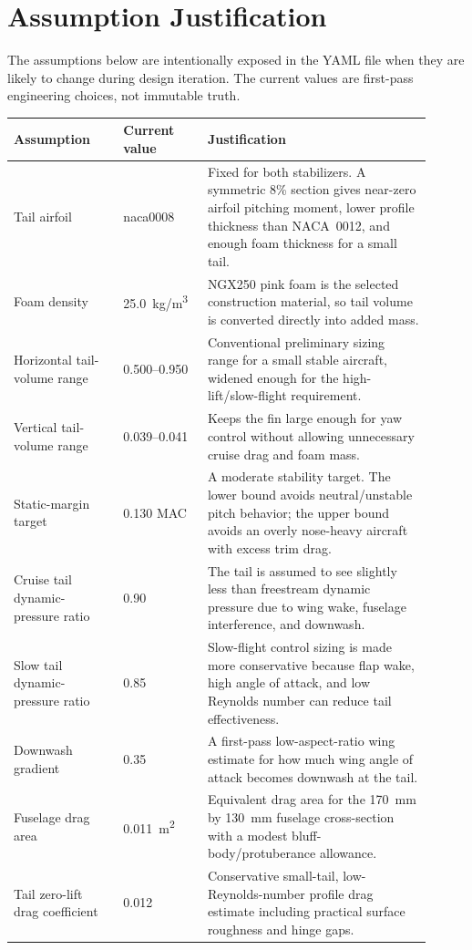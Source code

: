 \documentclass[11pt]{article}
\begin{document}
\section{Assumption Justification}
The assumptions below are intentionally exposed in the YAML file when they are likely to change during design iteration. The current values are first-pass engineering choices, not immutable truth.
\begin{longtable}{@{}p{0.24\linewidth}p{0.18\linewidth}p{0.49\linewidth}@{}}
\toprule
Assumption & Current value & Justification \\
\midrule
Tail airfoil & naca0008 & Fixed for both stabilizers. A symmetric 8\% section gives near-zero airfoil pitching moment, lower profile thickness than NACA~0012, and enough foam thickness for a small tail. \\
Foam density & \SI{25.0}{kg/m^3} & NGX250 pink foam is the selected construction material, so tail volume is converted directly into added mass. \\
Horizontal tail-volume range & 0.500--0.950 & Conventional preliminary sizing range for a small stable aircraft, widened enough for the high-lift/slow-flight requirement. \\
Vertical tail-volume range & 0.039--0.041 & Keeps the fin large enough for yaw control without allowing unnecessary cruise drag and foam mass. \\
Static-margin target & 0.130 MAC & A moderate stability target. The lower bound avoids neutral/unstable pitch behavior; the upper bound avoids an overly nose-heavy aircraft with excess trim drag. \\
Cruise tail dynamic-pressure ratio & 0.90 & The tail is assumed to see slightly less than freestream dynamic pressure due to wing wake, fuselage interference, and downwash. \\
Slow tail dynamic-pressure ratio & 0.85 & Slow-flight control sizing is made more conservative because flap wake, high angle of attack, and low Reynolds number can reduce tail effectiveness. \\
Downwash gradient & 0.35 & A first-pass low-aspect-ratio wing estimate for how much wing angle of attack becomes downwash at the tail. \\
Fuselage drag area & \SI{0.011}{m^2} & Equivalent drag area for the \SI{170}{mm} by \SI{130}{mm} fuselage cross-section with a modest bluff-body/protuberance allowance. \\
Tail zero-lift drag coefficient & 0.012 & Conservative small-tail, low-Reynolds-number profile drag estimate including practical surface roughness and hinge gaps. \\

\end{longtable}
\end{document}
